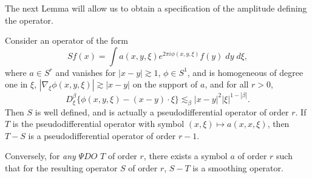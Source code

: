 The next Lemma will allow us to obtain a specification of the amplitude defining the operator.

\begin{lemma}
    Consider an operator of the form
    \[ Sf(x) = \int a(x,y,\xi) e^{2 \pi i \phi(x,y,\xi)} f(y)\; dy\; d\xi, \]
    where $a \in S^r$ and vanishes for $|x - y| \gtrsim 1$, $\phi \in S^1$, and is homogeneous of degree one in $\xi$, $|\nabla_\xi \phi(x,y,\xi)| \gtrsim |x - y|$ on the support of $a$, and for all $r > 0$,
    \[ D^\beta_\xi \{ \phi(x,y,\xi) - (x - y) \cdot \xi \} \lesssim_\beta |x - y|^2 |\xi|^{1-|\beta|}. \]
    Then $S$ is well defined, and is actually a pseudodifferential operator of order $r$. If $T$ is the pseudodifferential operator with symbol $(x,\xi) \mapsto a(x,x,\xi)$, then $T - S$ is a pseudodifferential operator of order $r-1$.

    Conversely, for \emph{any} $\Psi DO$ $T$ of order $r$, there exists a symbol $a$ of order $r$ such that for the resulting operator $S$ of order $r$, $S - T$ is a smoothing operator.
\end{lemma}
